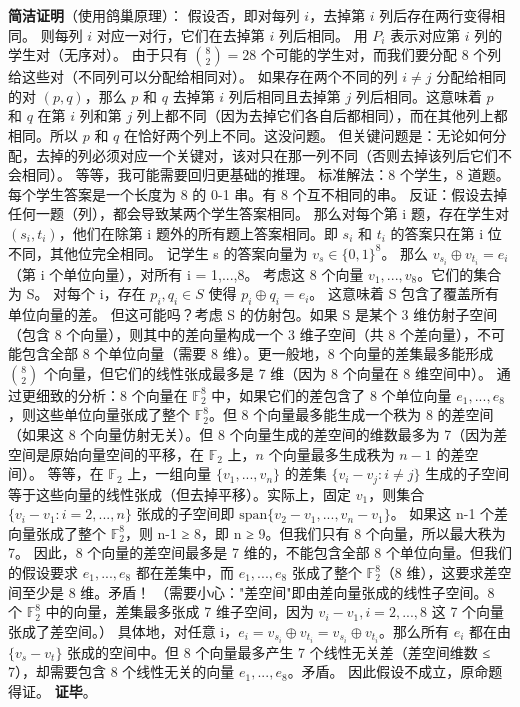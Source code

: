 \documentclass[10pt,a4paper,openany]{ctexbook}
\theoremstyle{definition}
\theoremstyle{remark}
\begin{document}
\textbf{简洁证明}（使用鸽巢原理）：
假设否，即对每列 $i$，去掉第 $i$ 列后存在两行变得相同。
则每列 $i$ 对应一对行，它们在去掉第 $i$ 列后相同。
用 $P_i$ 表示对应第 $i$ 列的学生对（无序对）。
由于只有 $\binom{8}{2} = 28$ 个可能的学生对，而我们要分配 8 个列给这些对（不同列可以分配给相同对）。
如果存在两个不同的列 $i \neq j$ 分配给相同的对 $(p,q)$，那么 $p$ 和 $q$ 去掉第 $i$ 列后相同且去掉第 $j$ 列后相同。这意味着 $p$ 和 $q$ 在第 $i$ 列和第 $j$ 列上都不同（因为去掉它们各自后都相同），而在其他列上都相同。所以 $p$ 和 $q$ 在恰好两个列上不同。这没问题。
但关键问题是：无论如何分配，去掉的列必须对应一个关键对，该对只在那一列不同（否则去掉该列后它们不会相同）。
等等，我可能需要回归更基础的推理。
标准解法：8 个学生，8 道题。每个学生答案是一个长度为 8 的 0-1 串。有 8 个互不相同的串。
反证：假设去掉任何一题（列），都会导致某两个学生答案相同。
那么对每个第 i 题，存在学生对 $(s_i, t_i)$，他们在除第 i 题外的所有题上答案相同。即 $s_i$ 和 $t_i$ 的答案只在第 i 位不同，其他位完全相同。
记学生 s 的答案向量为 $v_s \in \{0,1\}^8$。
那么 $v_{s_i} \oplus v_{t_i} = e_i$（第 i 个单位向量），对所有 i = 1,...,8。
考虑这 8 个向量 $v_1,...,v_8$。它们的集合为 S。
对每个 i，存在 $p_i, q_i \in S$ 使得 $p_i \oplus q_i = e_i$。
这意味着 S 包含了覆盖所有单位向量的差。
但这可能吗？考虑 S 的仿射包。如果 S 是某个 3 维仿射子空间（包含 8 个向量），则其中的差向量构成一个 3 维子空间（共 8 个差向量），不可能包含全部 8 个单位向量（需要 8 维）。更一般地，8 个向量的差集最多能形成 $\binom{8}{2}$ 个向量，但它们的线性张成最多是 7 维（因为 8 个向量在 8 维空间中）。
通过更细致的分析：8 个向量在 $\mathbb{F}_2^8$ 中，如果它们的差包含了 8 个单位向量 $e_1, ..., e_8$，则这些单位向量张成了整个 $\mathbb{F}_2^8$。但 8 个向量最多能生成一个秩为 8 的差空间（如果这 8 个向量仿射无关）。但 8 个向量生成的差空间的维数最多为 7（因为差空间是原始向量空间的平移，在 $\mathbb{F}_2$ 上，$n$ 个向量最多生成秩为 $n-1$ 的差空间）。
等等，在 $\mathbb{F}_2$ 上，一组向量 $\{v_1,...,v_n\}$ 的差集 $\{v_i - v_j : i \neq j\}$ 生成的子空间等于这些向量的线性张成（但去掉平移）。实际上，固定 $v_1$，则集合 $\{v_i - v_1 : i = 2,...,n\}$ 张成的子空间即 $\text{span}\{v_2-v_1, ..., v_n-v_1\}$。
如果这 n-1 个差向量张成了整个 $\mathbb{F}_2^8$，则 n-1 ≥ 8，即 n ≥ 9。但我们只有 8 个向量，所以最大秩为 7。
因此，8 个向量的差空间最多是 7 维的，不能包含全部 8 个单位向量。但我们的假设要求 $e_1,...,e_8$ 都在差集中，而 $e_1,...,e_8$ 张成了整个 $\mathbb{F}_2^8$（8 维），这要求差空间至少是 8 维。矛盾！
（需要小心："差空间"即由差向量张成的线性子空间。8 个 $\mathbb{F}_2^8$ 中的向量，差集最多张成 7 维子空间，因为 $v_i - v_1, i=2,...,8$ 这 7 个向量张成了差空间。）
具体地，对任意 i，$e_i = v_{s_i} \oplus v_{t_i} = v_{s_i} \oplus v_{t_i}$。那么所有 $e_i$ 都在由 $\{v_s - v_t\}$ 张成的空间中。但 8 个向量最多产生 7 个线性无关差（差空间维数 ≤ 7），却需要包含 8 个线性无关的向量 $e_1,...,e_8$。矛盾。
因此假设不成立，原命题得证。
\textbf{证毕}。
\end{document}
